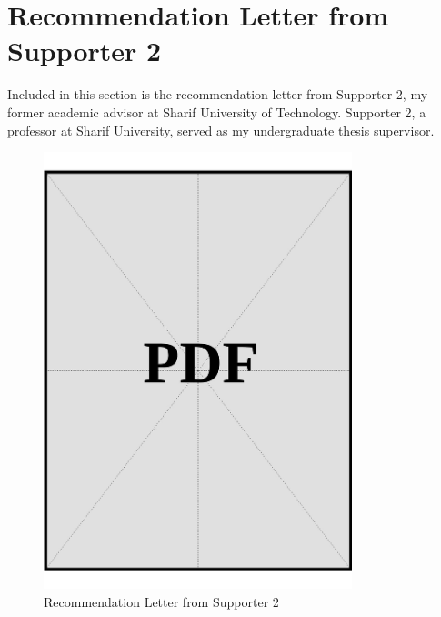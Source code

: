 \clearpage

\section{Recommendation Letter from Supporter 2}\label{sec:recommendation-letter-2}

Included in this section is the recommendation letter from Supporter 2, my former academic advisor at Sharif University of Technology. Supporter 2, a professor at Sharif University, served as my undergraduate thesis supervisor.

\begin{figure}[H]
    \centering
    \includegraphics[page=1, width=0.8\textwidth]{../docs/applicant/recommendation-letters/letter-2.pdf}
    \caption{Recommendation Letter from Supporter 2}
    \label{fig:recommendation-letter-2}
\end{figure}

\clearpage
